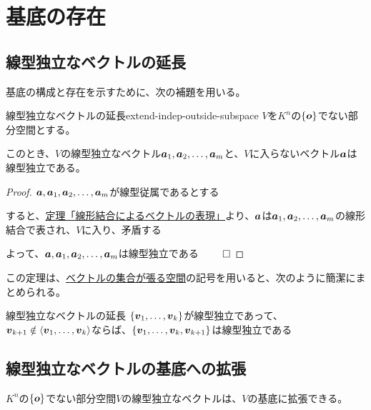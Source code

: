 \documentclass[../../../topic_linear-algebra]{subfiles}
\begin{document}
\sectionline
\section{基底の存在}

\subsection{線型独立なベクトルの延長}

基底の構成と存在を示すために、次の補題を用いる。

\begin{theorem}{線型独立なベクトルの延長}{extend-indep-outside-subspace}
  $V$を$K^n$の$\{\vb*{o} \}$でない部分空間とする。

  このとき、$V$の線型独立なベクトル$\vb*{a}_1, \vb*{a}_2, \dots, \vb*{a}_m$と、$V$に入らないベクトル$\vb*{a}$は線型独立である。
\end{theorem}

\begin{proof}
  $\vb*{a}, \vb*{a}_1, \vb*{a}_2, \dots, \vb*{a}_m$が線型従属であるとする

  すると、\hyperref[thm:dep-vec-is-lincomb]{定理「線形結合によるベクトルの表現」}より、$\vb*{a}$は$\vb*{a}_1, \vb*{a}_2, \dots, \vb*{a}_m$の線形結合で表され、$V$に入り、矛盾する

  よって、$\vb*{a}, \vb*{a}_1, \vb*{a}_2, \dots, \vb*{a}_m$は線型独立である $\qed$
\end{proof}

\br

この定理は、\hyperref[def:span-of-vectors]{ベクトルの集合が張る空間}の記号を用いると、次のように簡潔にまとめられる。

\begin{theorem*}{線型独立なベクトルの延長}
  $\{ \vb*{v}_1, \dots, \vb*{v}_k \}$が線型独立であって、$\vb*{v}_{k+1} \notin \langle \vb*{v}_1, \dots, \vb*{v}_k \rangle$ならば、$\{ \vb*{v}_1, \dots, \vb*{v}_k, \vb*{v}_{k+1} \}$は線型独立である
\end{theorem*}

\subsection{線型独立なベクトルの基底への拡張}

$K^n$の$\{\vb*{o} \}$でない部分空間$V$の線型独立なベクトルは、$V$の基底に拡張できる。
\end{document}
